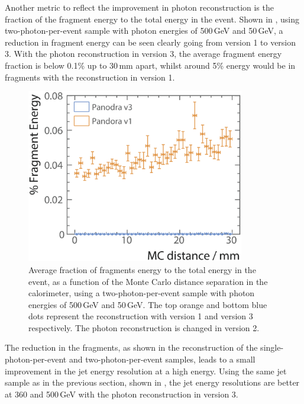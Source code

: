 Another metric to reflect the improvement in photon reconstruction is the fraction of the fragment energy to the total energy in the event. Shown in , using two-photon-per-event sample with photon energies of  500\,GeV and 50\,GeV, a reduction in fragment energy can be seen clearly going from \pandora version 1 to version 3. With the photon reconstruction in \pandora version 3, the average fragment energy fraction is below 0.1\% up to 30\,mm apart, whilst around 5\% energy would be in fragments with the reconstruction in \pandora version 1. 
\begin{figure}[tbph]
\centering
\includegraphics[width=0.85\textwidth]{photon/DoubleCompareFragEnergy2}
\caption[Average fraction fragments energy to the total energy, as a function of the MC distance separation]
{Average fraction of fragments energy to the total energy  in the event, as a function of the Monte Carlo distance separation in the calorimeter, using a two-photon-per-event sample with photon energies of  500\,GeV and 50\,GeV. The top orange and bottom blue dots represent the reconstruction with \pandora version 1 and version 3 respectively. The photon reconstruction is changed in \pandora version 2.}
\label{fig:photonDoubleFragEnergy}
\end{figure}




The reduction in the fragments, as shown in the reconstruction of the single-photon-per-event and two-photon-per-event samples, leads to a small improvement in the jet energy resolution at a high energy. Using the same jet sample as in the previous section, shown in , the jet energy resolutions are better at 360 and 500\,GeV with the  photon reconstruction in \pandora version 3.

